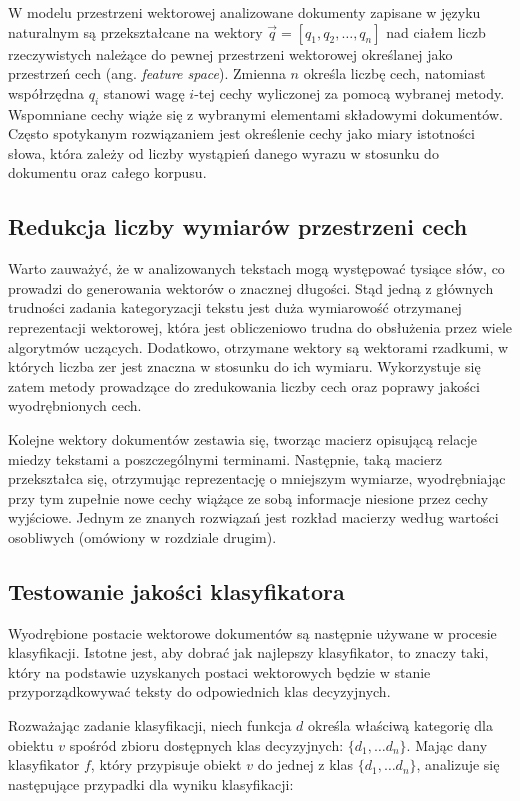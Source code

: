 \documentclass{pracamgr}
\begin{document}
W modelu przestrzeni wektorowej analizowane dokumenty zapisane w języku naturalnym są przekształcane na wektory $\vec{q} = [q_1, q_2, \ldots, q_n]$ nad ciałem liczb rzeczywistych należące do pewnej przestrzeni wektorowej określanej jako przestrzeń cech (ang. \textit{feature space}). Zmienna $n$ określa liczbę cech, natomiast współrzędna $q_i$ stanowi wagę $i$-tej cechy wyliczonej za pomocą wybranej metody. Wspomniane cechy wiąże się z wybranymi elementami składowymi dokumentów. Często spotykanym rozwiązaniem jest określenie cechy jako miary istotności słowa, która zależy od liczby wystąpień danego wyrazu w stosunku do dokumentu oraz całego korpusu. 

\subsection{Redukcja liczby wymiarów przestrzeni cech}

Warto zauważyć, że w analizowanych tekstach mogą występować tysiące słów, co prowadzi do generowania wektorów o znacznej długości. Stąd jedną z głównych trudności zadania kategoryzacji tekstu jest duża wymiarowość otrzymanej reprezentacji wektorowej, która jest obliczeniowo trudna do obsłużenia przez wiele algorytmów uczących. Dodatkowo, otrzymane wektory są wektorami rzadkumi, w których liczba zer jest znaczna w stosunku do ich wymiaru. Wykorzystuje się zatem metody prowadzące do zredukowania liczby cech oraz poprawy jakości wyodrębnionych cech.

Kolejne wektory dokumentów zestawia się, tworząc macierz opisującą relacje miedzy tekstami a poszczególnymi terminami. Następnie, taką macierz przekształca się, otrzymując reprezentację o mniejszym wymiarze, wyodrębniając przy tym zupełnie nowe cechy wiążące ze sobą informacje niesione przez cechy wyjściowe. Jednym ze znanych rozwiązań jest rozkład macierzy według wartości osobliwych (omówiony w rozdziale drugim).

\subsection{Testowanie jakości klasyfikatora}

Wyodrębione postacie wektorowe dokumentów są następnie używane w procesie klasyfikacji. Istotne jest, aby dobrać jak najlepszy klasyfikator, to znaczy taki, który na podstawie uzyskanych postaci wektorowych będzie w stanie przyporządkowywać teksty do odpowiednich klas decyzyjnych. 

Rozważając zadanie klasyfikacji, niech funkcja $d$ określa właściwą kategorię dla obiektu $v$ spośród zbioru dostępnych klas decyzyjnych: $\{ d_1, \ldots d_n \}$.  Mając dany klasyfikator $f$, który przypisuje obiekt $v$ do jednej z klas $\{ d_1, \ldots d_n \}$, analizuje się następujące przypadki dla wyniku klasyfikacji:
\end{document}
